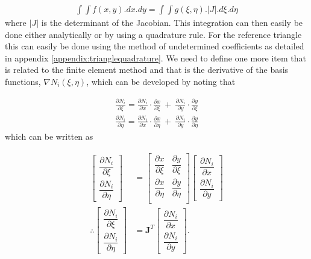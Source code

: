 \documentclass[11pt,letterpaper,titlepage]{article}
\newcommand{\beq}{\begin{equation*}
\begin{aligned}}
\newcommand{\eeq}{\end{aligned}
\end{equation*}}
\numberwithin{equation}{section}
\begin{document}
\beq 
\int \int f(x,y) .dx.dy = \int \int g (\xi,\eta).|J|.d\xi.d\eta
\eeq 
\newline
where $|J|$ is the determinant of the Jacobian. This integration can then easily be done either analytically or by using a quadrature rule. For the reference triangle this can easily be done using the method of undetermined coefficients as detailed in appendix \ref{appendix:trianglequadrature}.
\newline
\newline 
We need to define one more item that is related to the finite element method and that is the derivative of the basis functions, $\nabla N_i(\xi,\eta)$, which can be developed by noting that

\beq 
\frac{\partial N_i}{\partial \xi} = 
\frac{\partial N_i}{\partial x}\cdot \frac{\partial x}{\partial \xi} \ + \ 
\frac{\partial N_i}{\partial y}\cdot  \frac{\partial y}{\partial \xi}
\eeq 
\beq 
\frac{\partial N_i}{\partial \eta} = 
\frac{\partial N_i}{\partial x}\cdot \frac{\partial x}{\partial \eta} \ + \ 
\frac{\partial N_i}{\partial y}\cdot  \frac{\partial y}{\partial \eta}
\eeq 
\newline
which can be written as

\begingroup
\renewcommand*{\arraystretch}{1.5}
\beq
\begin{bmatrix}
\dfrac{\partial N_i}{\partial \xi} \\
\dfrac{\partial N_i}{\partial \eta}
\end{bmatrix}
&=
\begin{bmatrix}
\dfrac{\partial x}{\partial \xi}   &\dfrac{\partial y}{\partial \xi} \\
\dfrac{\partial x}{\partial \eta}   &\dfrac{\partial y}{\partial \eta} \\
\end{bmatrix}
\begin{bmatrix}
\dfrac{\partial N_i}{\partial x} \\
\dfrac{\partial N_i}{\partial y}
\end{bmatrix} \\
\therefore 
\begin{bmatrix}
\dfrac{\partial N_i}{\partial \xi} \\
\dfrac{\partial N_i}{\partial \eta}
\end{bmatrix}
&= \mathbf{J}^T 
\begin{bmatrix}
\dfrac{\partial N_i}{\partial x} \\
\dfrac{\partial N_i}{\partial y}
\end{bmatrix}.
\eeq 
\endgroup
\end{document}
